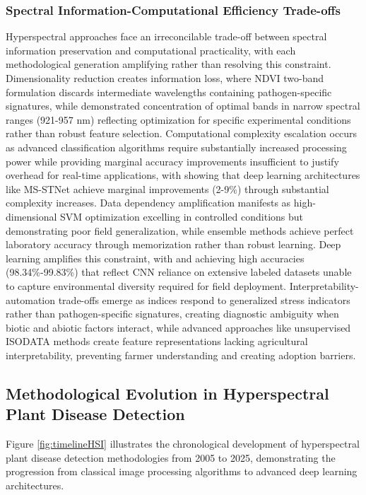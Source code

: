 \documentclass[sn-mathphys]{sn-jnl}
\theoremstyle{thmstyleone}%
\theoremstyle{thmstyletwo}%
\theoremstyle{thmstylethree}%
\begin{document}
\subsubsection{Spectral Information-Computational Efficiency Trade-offs}
Hyperspectral approaches face an irreconcilable trade-off between spectral information preservation and computational practicality, with each methodological generation amplifying rather than resolving this constraint. Dimensionality reduction creates information loss, where NDVI two-band formulation discards intermediate wavelengths containing pathogen-specific signatures, while \citet{shuaibu2018unsupervised} demonstrated concentration of optimal bands in narrow spectral ranges (921-957 nm) reflecting optimization for specific experimental conditions rather than robust feature selection. Computational complexity escalation occurs as advanced classification algorithms require substantially increased processing power while providing marginal accuracy improvements insufficient to justify overhead for real-time applications, with \citet{swaraj2025xception} showing that deep learning architectures like MS-STNet achieve marginal improvements (2-9\%) through substantial complexity increases. Data dependency amplification manifests as high-dimensional SVM optimization excelling in controlled conditions but demonstrating poor field generalization, while ensemble methods achieve perfect laboratory accuracy through memorization rather than robust learning. Deep learning amplifies this constraint, with \citet{jia2023net} and \citet{gao2023detection} achieving high accuracies (98.34\%-99.83\%) that reflect CNN reliance on extensive labeled datasets unable to capture environmental diversity required for field deployment. Interpretability-automation trade-offs emerge as indices respond to generalized stress indicators rather than pathogen-specific signatures, creating diagnostic ambiguity when biotic and abiotic factors interact, while advanced approaches like unsupervised ISODATA methods create feature representations lacking agricultural interpretability, preventing farmer understanding and creating adoption barriers.

\subsection{Methodological Evolution in Hyperspectral Plant Disease Detection}

Figure \ref{fig:timelineHSI} illustrates the chronological development of hyperspectral plant disease detection methodologies from 2005 to 2025, demonstrating the progression from classical image processing algorithms to advanced deep learning architectures. 
\end{document}
